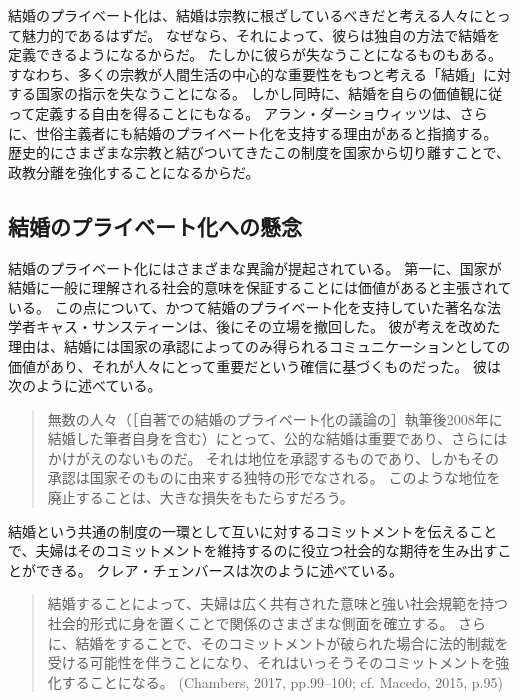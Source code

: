 \documentclass[paper=a4,book,openany]{jlreq}
\newcommand{\ig}[1]{}           %
\begin{document}
結婚のプライベート化は、結婚は宗教に根ざしているべきだと考える人々にとって魅力的であるはずだ。
なぜなら、それによって、彼らは独自の方法で結婚を定義できるようになるからだ。
たしかに彼らが失なうことになるものもある。
すなわち、多くの宗教が人間生活の中心的な重要性をもつと考える「結婚」に対する国家の指示を失なうことになる。
しかし同時に、結婚を自らの価値観に従って定義する自由を得ることにもなる。
アラン・ダーショウィッツは、さらに、世俗主義者にも結婚のプライベート化を支持する理由があると指摘する。
歴史的にさまざまな宗教と結びついてきたこの制度を国家から切り離すことで、政教分離を強化することになるからだ\citep{dershowitz03:_to_fix_gay_dilem_gover}。

\subsection{結婚のプライベート化への懸念}

結婚のプライベート化にはさまざまな異論が提起されている。
第一に、国家が結婚に一般に理解される社会的意味を保証することには価値があると主張されている。
この点について、かつて結婚のプライベート化を支持していた著名な法学者キャス・サンスティーンは、後にその立場を撤回した。
彼が考えを改めた理由は、結婚には国家の承認によってのみ得られるコミュニケーションとしての価値があり、それが人々にとって重要だという確信に基づくものだった。
彼は次のように述べている。

\begin{quote}
無数の人々（［自著での結婚のプライベート化の議論の］執筆後2008年に結婚した筆者自身を含む）にとって、公的な結婚は重要であり、さらにはかけがえのないものだ。
それは地位を承認するものであり、しかもその承認は国家そのものに由来する独特の形でなされる。
このような地位を廃止することは、大きな損失をもたらすだろう。
\citep[p.296]{sunstein17:_statem_i_most_regret}
\end{quote}

結婚という共通の制度の一環として互いに対するコミットメントを伝えることで、夫婦はそのコミットメントを維持するのに役立つ社会的な期待を生み出すことができる。
クレア・チェンバースは次のように述べている。

\begin{quote}
結婚することによって、夫婦は広く共有された意味と強い社会規範を持つ社会的形式に身を置くことで関係のさまざまな側面を確立する。
さらに、結婚をすることで、そのコミットメントが破られた場合に法的制裁を受ける可能性を伴うことになり、それはいっそうそのコミットメントを強化することになる。
(Chambers, 2017, pp.99--100; cf. Macedo, 2015, p.95) \nocite{chambers17:againstmarriage} \nocite{macedo15:_just_married}\ig{Clare chmbers}
\end{quote}
\end{document}
